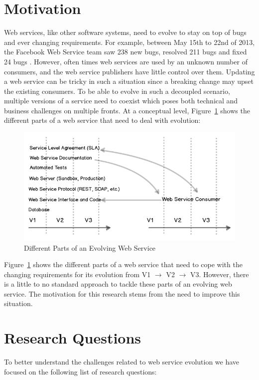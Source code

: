 \documentclass[runningheads,a4paper]{llncs}
\begin{document}
\section{Motivation} %
\label{sec:motivation}
Web services, like other software systems, need to evolve to stay on top of bugs and ever changing requirements. For example, between May 15th to 22nd of 2013, the Facebook Web Service team saw 238 new bugs, resolved 211 bugs and fixed 24 bugs \cite{facebook_release_note}. However, often times web services are used by an unknown number of consumers, and the web service publishers have little control over them. Updating a web service can be tricky in such a situation since a breaking change may upset the existing consumers. To be able to evolve in such a decoupled scenario, multiple versions of a service need to coexist which poses both technical and business challenges on multiple fronts. At a conceptual level, Figure~\ref{fig:web_service_layers} shows the different parts of a web service that need to deal with evolution:


\begin{figure}[ht]
  \centering
  \includegraphics[width=\textwidth]{web_service_aspects.png}
    \caption{Different Parts of an Evolving Web Service}
  \label{fig:web_service_layers}
\end{figure}

Figure~\ref{fig:web_service_layers} shows the different parts of a web service that need to cope with the changing requirements for its evolution from V1 $\rightarrow$ V2 $\rightarrow$ V3. However, there is a little to no standard approach to tackle these parts of an evolving web service. The motivation for this research stems from the need to improve this situation.


\section{Research Questions} %
\label{sec:research_questions}
To better understand the challenges related to web service evolution we have focused on the following list of research questions:
\end{document}
